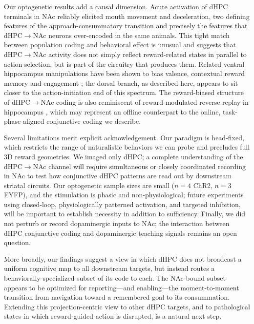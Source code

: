 \documentclass[11pt]{article}
\begin{document}
Our optogenetic results add a causal dimension. Acute activation of dHPC terminals in NAc reliably elicited mouth movement and deceleration, two defining features of the approach-consummatory transition and precisely the features that dHPC$\rightarrow$NAc neurons over-encoded in the same animals. This tight match between population coding and behavioral effect is unusual and suggests that dHPC$\rightarrow$NAc activity does not simply reflect reward-related states in parallel to action selection, but is part of the circuitry that produces them. Related ventral hippocampus manipulations have been shown to bias valence, contextual reward memory and engagement \citep{Ciocchi2015Selective,Nguyen2024Cholecystokinin,Iyer2025Engagement,Bakoyiannis2023Pathway}; the dorsal branch, as described here, appears to sit closer to the action-initiation end of this spectrum. The reward-biased structure of dHPC$\rightarrow$NAc coding is also reminiscent of reward-modulated reverse replay in hippocampus \citep{Ambrose2016Replay}, which may represent an offline counterpart to the online, task-phase-aligned conjunctive coding we describe.

Several limitations merit explicit acknowledgement. Our paradigm is head-fixed, which restricts the range of naturalistic behaviors we can probe and precludes full 3D reward geometries. We imaged only dHPC; a complete understanding of the dHPC$\rightarrow$NAc channel will require simultaneous or closely coordinated recording in NAc to test how conjunctive dHPC patterns are read out by downstream striatal circuits. Our optogenetic sample sizes are small ($n=4$ ChR2, $n=3$ EYFP), and the stimulation is phasic and non-physiological; future experiments using closed-loop, physiologically patterned activation, and targeted inhibition, will be important to establish necessity in addition to sufficiency. Finally, we did not perturb or record dopaminergic inputs to NAc; the interaction between dHPC conjunctive coding and dopaminergic teaching signals \citep{Mamad2017PlaceField,Jung2024Dopamine} remains an open question.

More broadly, our findings suggest a view in which dHPC does not broadcast a uniform cognitive map to all downstream targets, but instead routes a behaviorally-specialized subset of its code to each. The NAc-bound subset appears to be optimized for reporting---and enabling---the moment-to-moment transition from navigation toward a remembered goal to its consummation. Extending this projection-centric view to other dHPC targets, and to pathological states in which reward-guided action is disrupted, is a natural next step.
\end{document}
